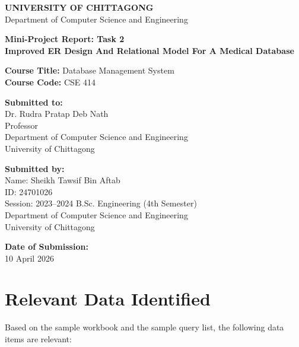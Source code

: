 \documentclass[12pt,a4paper]{article}
\begin{document}
\begin{center}
\textbf{UNIVERSITY OF CHITTAGONG}\\
Department of Computer Science and Engineering
\end{center}

\vspace{0.8cm}

\begin{center}
\textbf{\Large Mini-Project Report: Task 2}\\
\textbf{Improved ER Design And Relational Model For A Medical Database}
\end{center}

\vspace{0.8cm}

\textbf{Course Title:} Database Management System\\
\textbf{Course Code:} CSE 414

\vspace{0.8cm}

\textbf{Submitted to:}\\
Dr. Rudra Pratap Deb Nath\\
Professor\\
Department of Computer Science and Engineering\\
University of Chittagong

\vspace{0.8cm}

\textbf{Submitted by:}\\
Name: Sheikh Tawsif Bin Aftab\\
ID: 24701026\\
Session: 2023--2024 B.Sc. Engineering (4th Semester)\\
Department of Computer Science and Engineering\\
University of Chittagong

\vspace{0.8cm}

\textbf{Date of Submission:}\\
10 April 2026

\newpage

\section{Relevant Data Identified}
Based on the sample workbook and the sample query list, the following data items are relevant:
\end{document}

